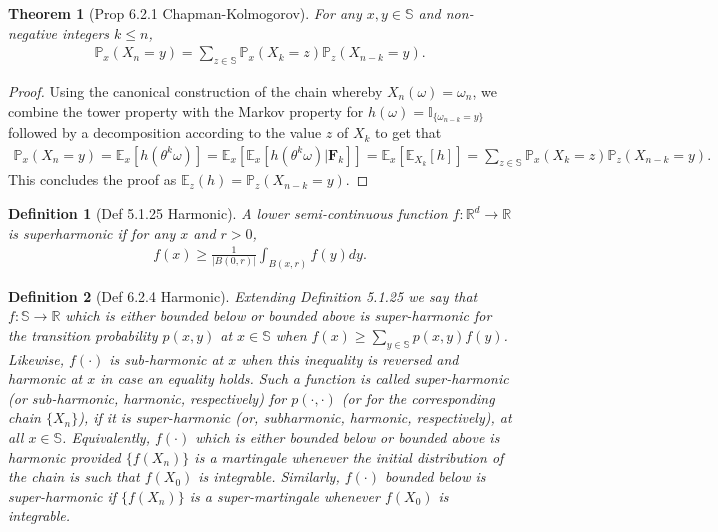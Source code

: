 \documentclass[11pt,a4paper]{article}
\numberwithin{equation}{section}%
\newtheorem{theorem}{Theorem}[]
\newtheorem{definition}{Definition}[]
\begin{document}
\begin{theorem}[Prop 6.2.1 Chapman-Kolmogorov]
    For any $x, y \in \mathbb{S}$ and non-negative integers $k \leq n$,
    \begin{align*}
        \mathbb{P}_{ x }\left( X_n = y \right) = \sum_{z \in \mathbb{S}} \mathbb{P}_{ x }\left( X_k = z \right) \mathbb{P}_{ z }\left( X_{n-k} = y \right).
    \end{align*}
\end{theorem}

\begin{proof}
    Using the canonical construction of the chain whereby $X_n(\omega) = \omega_n$, we combine the tower property with the Markov property for $h(\omega) = \mathbb{I}_{\{\omega_{n-k} = y\}}$ followed by a decomposition according to the value $z$ of $X_k$ to get that
    \begin{align*}
        \mathbb{P}_{ x }\left( X_n = y \right) = \mathbb{E}_{ x }\left[ h(\theta^k \omega) \right] = \mathbb{E}_{ x }\left[ \mathbb{E}_{x} \left[ h(\theta ^k\omega )|\mathbf{F}_{k} \right] \right] = \mathbb{E}_{ x }\left[ \mathbb{E}_{ X_k }\left[ h \right]  \right] = \sum_{z \in \mathbb{S}} \mathbb{P}_{ x }\left( X_k = z \right) \mathbb{P}_{ z }\left( X_{n-k} = y \right).
    \end{align*}
    This concludes the proof as $\mathbb{E}_{ z }\left( h \right) = \mathbb{P}_{ z }\left( X_{n-k} = y \right)$.
    
    
\end{proof}

\begin{definition}[Def 5.1.25 Harmonic]
    A lower semi-continuous function $f : \mathbb{R}^d \to \mathbb{R}$ is superharmonic if for any $x$ and $r > 0$,
    \begin{align*}
        f(x) \geq \frac{1}{|B(0, r)|} \int_{B(x,r)} f(y)dy.
    \end{align*}
\end{definition}


\begin{definition}[Def 6.2.4 Harmonic]
    Extending Definition 5.1.25 we say that $f : \mathbb{S} \to \mathbb{R}$ which is either bounded below or bounded above is super-harmonic for the transition probability $p(x, y)$ at $x \in \mathbb{S}$ when $f(x) \geq \sum_{y \in \mathbb{S}} p(x, y)f(y)$. Likewise, $f(\cdot)$ is sub-harmonic at $x$ when this inequality is reversed and harmonic at $x$ in case an equality holds. Such a function is called super-harmonic (or sub-harmonic, harmonic, respectively) for $p(\cdot, \cdot)$ (or for the corresponding chain $\{X_n\}$), if it is super-harmonic (or, subharmonic, harmonic, respectively), at all $x \in \mathbb{S}$. Equivalently, $f(\cdot)$ which is either bounded below or bounded above is harmonic provided $\{f(X_n)\}$ is a martingale whenever the initial distribution of the chain is such that $f(X_0)$ is integrable. Similarly, $f(\cdot)$ bounded below is super-harmonic if $\{f(X_n)\}$ is a super-martingale whenever $f(X_0)$ is integrable.
    
\end{definition}
\end{document}
